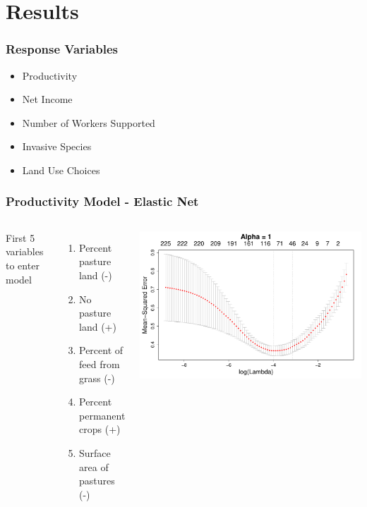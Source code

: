 \documentclass{beamer}
\begin{document}
\section{Results}

\begin{frame}
\frametitle{Response Variables}
\begin{itemize}
	\item{Productivity}
	\item{Net Income}
	\item{Number of Workers Supported}
	\item{Invasive Species}
	\item{Land Use Choices}
\end{itemize}
\end{frame}

\begin{frame}
\frametitle{Productivity Model - Elastic Net}

\begin{columns}

First 5 variables to enter model
\begin{enumerate}
	\item Percent pasture land (-)
	\item No pasture land (+) 
	\item Percent of feed from grass (-) 
	\item Percent permanent crops (+) 
	\item Surface area of pastures (-)
\end{enumerate}

\includegraphics[scale=0.2]{elastic_cv_production}

\end{columns}
\end{frame}
\end{document}
